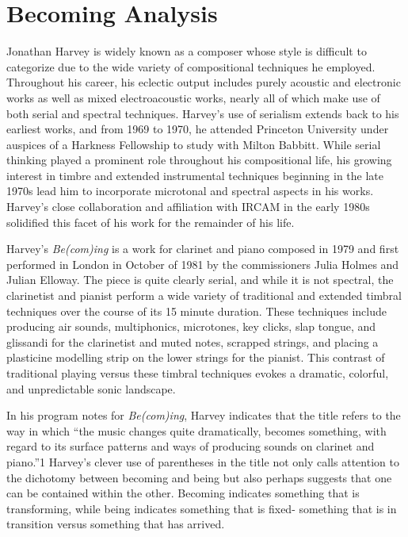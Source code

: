 \chapter{Becoming Analysis}
Jonathan Harvey is widely known as a composer whose style is difficult to categorize due to the wide variety of compositional techniques he employed. Throughout his career, his eclectic output includes purely acoustic and electronic works as well as mixed electroacoustic works, nearly all of which make use of both serial and spectral techniques. Harvey's use of serialism extends back to his earliest works, and from 1969 to 1970, he attended Princeton University under auspices of a Harkness Fellowship to study with Milton Babbitt. While serial thinking played a prominent role throughout his compositional life, his growing interest in timbre and extended instrumental techniques beginning in the late 1970s lead him to incorporate microtonal and spectral aspects in his works. Harvey's close collaboration and affiliation with IRCAM in the early 1980s solidified this facet of his work for the remainder of his life.

Harvey's \emph{Be(com)ing} is a work for clarinet and piano composed in 1979 and first performed in London in October of 1981 by the commissioners Julia Holmes and Julian Elloway. The piece is quite clearly serial, and while it is not spectral, the clarinetist and pianist perform a wide variety of traditional and extended timbral techniques over the course of its 15 minute duration. These techniques include producing air sounds, multiphonics, microtones, key clicks, slap tongue, and glissandi for the clarinetist and muted notes, scrapped strings, and placing a plasticine modelling strip on the lower strings for the pianist. This contrast of traditional playing versus these timbral techniques evokes a dramatic, colorful, and unpredictable sonic landscape.

In his program notes for \emph{Be(com)ing}, Harvey indicates that the title refers to the way in which ``the music changes quite dramatically, becomes something, with regard to its surface patterns and ways of producing sounds on clarinet and piano.''1 Harvey's clever use of parentheses in the title not only calls attention to the dichotomy between becoming and being but also perhaps suggests that one can be contained within the other. Becoming indicates something that is transforming, while being indicates something that is fixed- something that is in transition versus something that has arrived.

